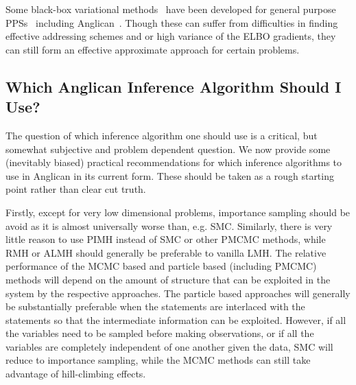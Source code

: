 Some black-box variational methods~\citep{ranganath_aistats_2014} 
	have been developed for general purpose PPSs~\citep{kucukelbir2015automatic} including Anglican~\citep{vandemeent2016black,paige2017thesis}.  Though these can suffer from difficulties
	in finding effective addressing schemes and or high variance of the ELBO gradients, they can still
	form an effective approximate approach for certain problems.

\subsection{Which Anglican Inference Algorithm Should I Use?}
\label{sec:proginf:str:which}

The question of which inference algorithm one should use is a critical, but somewhat subjective and
problem dependent question.  We now provide some (inevitably biased) practical recommendations for which
inference algorithms to use in Anglican in its current form.  These
should be taken as a rough starting point rather than clear cut truth.

Firstly, except for very low dimensional problems, importance sampling should
be avoid as it is almost universally worse than, e.g. SMC.  Similarly, there is very little reason to use PIMH
instead of SMC or other PMCMC methods, while RMH or ALMH should generally be preferable to vanilla LMH.
The relative performance of the MCMC
based and particle based (including PMCMC) methods will depend on the amount of structure that can
be exploited in the system by the respective approaches.  The particle based approaches will generally be substantially
preferable when the \observe statements are interlaced with the \sample statements so that the intermediate
information can be exploited.  However, if all the variables need to be sampled before making observations, or if
all the variables are completely independent of one another given the data, SMC will reduce to importance sampling,
while the MCMC methods can still take advantage of hill-climbing effects.

